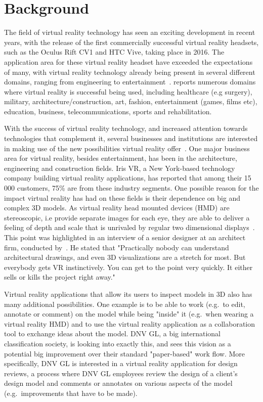 \section{Background}            
The field of virtual reality technology has seen an exciting development in recent years, 
with the release of the first commercially successful virtual reality headsets, such as the Oculus Rift CV1 and HTC Vive, taking place in 2016.
The application area for these virtual reality headset have exceeded the expectations of many, with virtual reality 
technology already being present in several different domains, ranging from engineering to entertainment~\citep{VRS2016}. 
\citet{VRS2016} reports numerous domains where virtual reality is successful being used, including 
healthcare (e.g surgery), military, architecture/construction, art, fashion, entertainment (games, films etc), education, business, telecommunications, sports and rehabilitation.

With the success of virtual reality technology, and increased attention towards technologies that complement it, several businesses and institutions 
are interested in making use of the new possibilities virtual reality offer~\citep{TW22016}. One major business area for virtual reality, besides entertainment, 
has been in the architecture, engineering and construction fields. Iris VR, a New York-based technology company building virtual reality applications, has reported that
among their 15 000 customers, 75\% are from these industry segments. One possible reason for the impact virtual reality has had on these fields is their dependence 
on big and complex 3D models. As virtual reality head mounted devices (HMD) are stereoscopic, i.e provide separate images for each eye, they are able to deliver a feeling of 
depth and scale that is unrivaled by regular two dimensional displays~\citep{POLYGON2016}. This point was highlighted in an interview of a senior designer at an architect 
firm, conducted by~\citet{TW22016}. He stated that "Practically nobody can understand architectural drawings, and even 3D visualizations are a stretch for most. 
But everybody gets VR instinctively. You can get to the point very quickly. It either sells or kills the project right away." 

Virtual reality applications that allow its users to inspect models in 3D also has many additional possibilities. 
One example is to be able to work (e.g.~to edit, annotate or comment) on the model while being "inside" it (e.g.~when wearing a virtual reality HMD) and 
to use the virtual reality application as a collaboration tool to exchange ideas about the model.
DNV GL, a big international classification society, is looking into exactly this, and sees this vision as a potential big improvement over their standard 
"paper-based" work flow. More specifically, DNV GL is interested in a virtual reality application for design reviews, a process where DNV GL employees review the 
design of a client's design model and comments or annotates on various aspects of the model (e.g.~improvements that have to be made).

